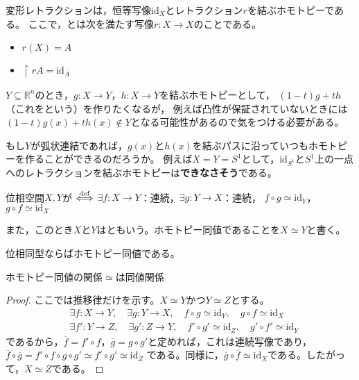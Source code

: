 \documentclass[uplatex]{jsarticle}
\begin{document}
\sukima {} 変形レトラクションは，恒等写像$\mathrm{id}_{X}$とレトラクション$r$を結ぶホモトピーである。
ここで，とは次を満たす写像$r \colon X \longrightarrow X$のことである。
\begin{itemize}
  \vspace{-0.5\baselineskip}
  \item $r(X) = A$
  \item $\restriction{r}{A} = \mathrm{id}_{A}$
\end{itemize}

\sukima {} $Y \subseteq \mathbb{R}^{n}$のとき，$g \colon X \longrightarrow Y$，$h \colon X \longrightarrow Y$を結ぶホモトピーとして，
$(1-t)g+th$（これをという）を作りたくなるが，
例えば凸性が保証されていないときには$(1-t)g(x) + t h(x) \notin Y$となる可能性があるので気をつける必要がある。

\sukima {} もし$Y$が弧状連結であれば，$g(x)$と$h(x)$を結ぶパスに沿っていつもホモトピーを作ることができるのだろうか。
例えば$X = Y = S^{1}$として，$\mathrm{id}_{S^{1}}$と$S^{1}$上の一点へのレトラクションを結ぶホモトピーは{\bf できなさそう}である。

\sukima {}

\begin{teigi}[ホモトピー同値]
  位相空間$X,Y$が $\overset{\mathrm{def}}{\Longleftrightarrow}$ $\exists f \colon X \longrightarrow Y$：連続，$\exists g \colon Y \longrightarrow X$：連続，
  $f \circ g \simeq \mathrm{id}_{Y}$，$g \circ f \simeq \mathrm{id}_{X}$

  また，このとき$X$と$Y$はともいう。ホモトピー同値であることを$X \simeq Y$と書く。
\end{teigi}

 位相同型ならばホモトピー同値である。

\begin{hodai}
  ホモトピー同値の関係$\simeq$は同値関係
\end{hodai}

\begin{proof}
  ここでは推移律だけを示す。$X \simeq Y$かつ$Y \simeq Z$とする。
  \begin{align}
    &\exists f \colon X \longrightarrow Y, \quad \exists g \colon Y \longrightarrow X, \quad f \circ g \simeq \mathrm{id}_{Y}, \quad g \circ f \simeq \mathrm{id}_{X} \\
    &\exists f' \colon Y \longrightarrow Z, \quad \exists g' \colon Z \longrightarrow Y, \quad f' \circ g' \simeq \mathrm{id}_{Z}, \quad g' \circ f' \simeq \mathrm{id}_{Y}
  \end{align}
  であるから，$\overline{f} = f' \circ f$，$\overline{g} = g \circ g'$と定めれば，これは連続写像であり，
  $\overline{f} \circ \overline{g} = f' \circ f \circ g \circ g' \simeq f' \circ g' \simeq \mathrm{id}_{Z}$
  である。同様に，$\overline{g} \circ \overline{f} \simeq \mathrm{id}_{X}$である。したがって，$X \simeq Z$である。
\end{proof}
\end{document}
